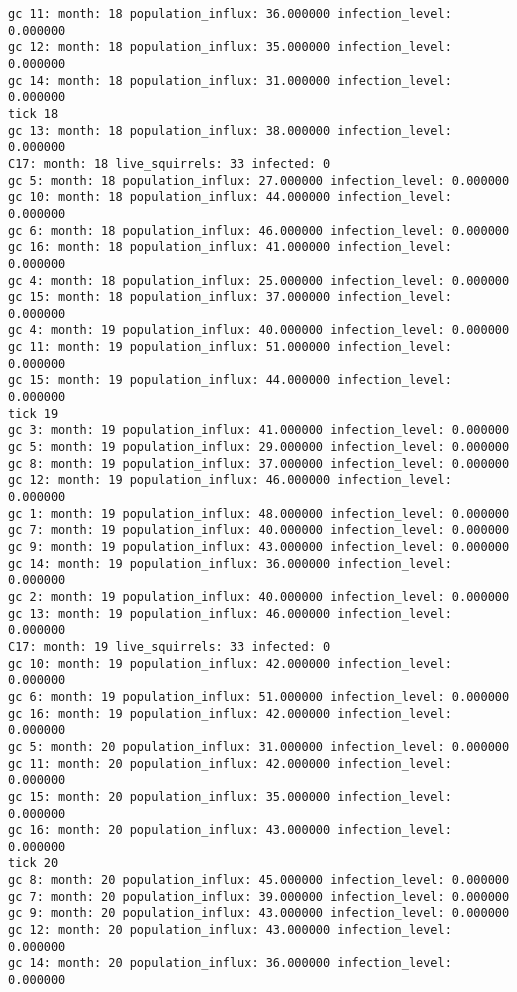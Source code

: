 \begin{lstlisting}[basicstyle=\small]
gc 11: month: 18 population_influx: 36.000000 infection_level: 0.000000
gc 12: month: 18 population_influx: 35.000000 infection_level: 0.000000
gc 14: month: 18 population_influx: 31.000000 infection_level: 0.000000
tick 18
gc 13: month: 18 population_influx: 38.000000 infection_level: 0.000000
C17: month: 18 live_squirrels: 33 infected: 0
gc 5: month: 18 population_influx: 27.000000 infection_level: 0.000000
gc 10: month: 18 population_influx: 44.000000 infection_level: 0.000000
gc 6: month: 18 population_influx: 46.000000 infection_level: 0.000000
gc 16: month: 18 population_influx: 41.000000 infection_level: 0.000000
gc 4: month: 18 population_influx: 25.000000 infection_level: 0.000000
gc 15: month: 18 population_influx: 37.000000 infection_level: 0.000000
gc 4: month: 19 population_influx: 40.000000 infection_level: 0.000000
gc 11: month: 19 population_influx: 51.000000 infection_level: 0.000000
gc 15: month: 19 population_influx: 44.000000 infection_level: 0.000000
tick 19
gc 3: month: 19 population_influx: 41.000000 infection_level: 0.000000
gc 5: month: 19 population_influx: 29.000000 infection_level: 0.000000
gc 8: month: 19 population_influx: 37.000000 infection_level: 0.000000
gc 12: month: 19 population_influx: 46.000000 infection_level: 0.000000
gc 1: month: 19 population_influx: 48.000000 infection_level: 0.000000
gc 7: month: 19 population_influx: 40.000000 infection_level: 0.000000
gc 9: month: 19 population_influx: 43.000000 infection_level: 0.000000
gc 14: month: 19 population_influx: 36.000000 infection_level: 0.000000
gc 2: month: 19 population_influx: 40.000000 infection_level: 0.000000
gc 13: month: 19 population_influx: 46.000000 infection_level: 0.000000
C17: month: 19 live_squirrels: 33 infected: 0
gc 10: month: 19 population_influx: 42.000000 infection_level: 0.000000
gc 6: month: 19 population_influx: 51.000000 infection_level: 0.000000
gc 16: month: 19 population_influx: 42.000000 infection_level: 0.000000
gc 5: month: 20 population_influx: 31.000000 infection_level: 0.000000
gc 11: month: 20 population_influx: 42.000000 infection_level: 0.000000
gc 15: month: 20 population_influx: 35.000000 infection_level: 0.000000
gc 16: month: 20 population_influx: 43.000000 infection_level: 0.000000
tick 20
gc 8: month: 20 population_influx: 45.000000 infection_level: 0.000000
gc 7: month: 20 population_influx: 39.000000 infection_level: 0.000000
gc 9: month: 20 population_influx: 43.000000 infection_level: 0.000000
gc 12: month: 20 population_influx: 43.000000 infection_level: 0.000000
gc 14: month: 20 population_influx: 36.000000 infection_level: 0.000000

\end{lstlisting}
